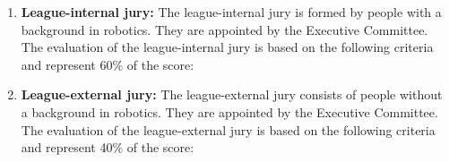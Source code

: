 \begin{enumerate}
\item\textbf{League-internal jury:} The league-internal jury is formed by people with a background in robotics. They are appointed by the Executive Committee. The evaluation of the league-internal jury is based on the following criteria and represent 60\% of the score:

\item \textbf{League-external jury:} The league-external jury consists of people without a background in robotics. They are appointed by the Executive Committee. The evaluation of the league-external jury is based on the following criteria and represent 40\% of the score:
\end{enumerate}



